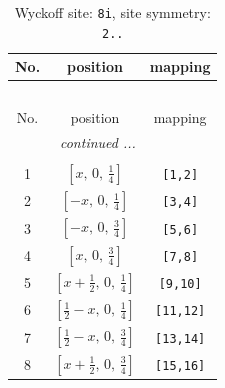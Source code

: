 \documentclass[fleqn,8pt]{jsarticle}
\begin{document}
\renewcommand{\arraystretch}{1.2}
\begin{longtable}{ccc}
\caption{Wyckoff site: {\tt 8i}, site symmetry: {\tt 2..}}
 \\
 \hline \hline
No. & position & mapping \\ \hline \endfirsthead

\multicolumn{2}{l}{\tablename\ \thetable{}} \\
 \hline \hline
No. & position & mapping \\ \hline \endhead

 \hline \hline
\multicolumn{2}{r}{\footnotesize\it continued ...} \\ \endfoot

 \hline \hline
\multicolumn{2}{r}{} \\ \endlastfoot

1 & $\left[ x,\, 0,\, \frac{1}{4} \right]$ & {\tt [1,2]} \\ \hline
2 & $\left[ - x,\, 0,\, \frac{1}{4} \right]$ & {\tt [3,4]} \\ \hline
3 & $\left[ - x,\, 0,\, \frac{3}{4} \right]$ & {\tt [5,6]} \\ \hline
4 & $\left[ x,\, 0,\, \frac{3}{4} \right]$ & {\tt [7,8]} \\ \hline
5 & $\left[ x + \frac{1}{2},\, 0,\, \frac{1}{4} \right]$ & {\tt [9,10]} \\ \hline
6 & $\left[ \frac{1}{2} - x,\, 0,\, \frac{1}{4} \right]$ & {\tt [11,12]} \\ \hline
7 & $\left[ \frac{1}{2} - x,\, 0,\, \frac{3}{4} \right]$ & {\tt [13,14]} \\ \hline
8 & $\left[ x + \frac{1}{2},\, 0,\, \frac{3}{4} \right]$ & {\tt [15,16]} \\
\end{longtable}
\renewcommand{\arraystretch}{1.2}
\end{document}
